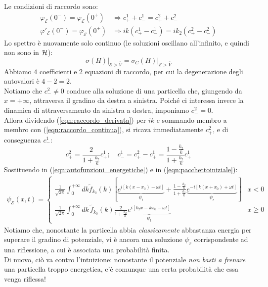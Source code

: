 \documentclass[../../FisicaTeorica.tex]{subfiles}
\begin{document}
Le condizioni di raccordo sono:
\begin{align}
\varphi_\mathcal{E}(0^-)=\varphi_\mathcal{E}(0^+) &\Rightarrow c^1_+ + c^1_- = c^2_+ + c_-^2
\label{eqn:raccordo_continua}
\\
\varphi'_\mathcal{E}(0^-)=\varphi_\mathcal{E}(0^+) &\Rightarrow ik(c_+^1 - c_-^1)=ik_2(c_+^2-c_-^2)
\label{eqn:raccordo_derivata}
\end{align}
Lo spettro è nuovamente solo continuo (le soluzioni oscillano all'infinito, e quindi non sono in $\mathcal{H}$):
\[
\sigma(H)\Big|_{\mathcal{E}>\bar{V}}=\sigma_C(H)\Big|_{\mathcal{E}>\bar{V}}
\]
Abbiamo $4$ coefficienti e $2$ equazioni di raccordo, per cui la degenerazione degli autovalori è $4-2=2$.\\
Notiamo che $c^2_- \neq 0$ conduce alla soluzione di una particella che, giungendo da $x=+\infty$, attraversa il gradino da destra a sinistra. Poiché ci interessa invece la dinamica di attraversamento da sinistra a destra, imponiamo $c^2_-=0$.\\
Allora dividendo (\ref{eqn:raccordo_derivata}) per $ik$ e sommando membro a membro con (\ref{eqn:raccordo_continua}), si ricava immediatamente $c^2_+$, e di conseguenza $c^1_-$:
\begin{equation}
c_+^2 = \frac{2}{1+\frac{k_2}{k}}c_+^1; \quad c_-^1=c^2_+-c^1_+=\frac{1-\frac{k_2}{k}}{1+\frac{k_2}{k}}c_+^1
\label{eqn:costanti_energetiche}
\end{equation}
Sostituendo in (\ref{eqn:autofunzioni_energetiche}) e in (\ref{eqn:pacchettoiniziale}):
\begin{align*}
\psi_\mathcal{E}(x,t) = 
\begin{cases}
\displaystyle
\frac{1}{\sqrt{2\pi}}\int_0^{+\infty} dk \tilde{f}_{k_0}(k) \left[
\underbrace{
e^{i[k(x-x_0)-\omega t]}}_{\psi_i}
+
\frac{1-\frac{k_2}{k}}{1+\frac{k_2}{k}}
\underbrace{e^{-i[k(x+x_0)+\omega t]}}_{\psi_r}
\right]
& x <0 \\
\displaystyle
\frac{1}{\sqrt{2\pi}}\int_0^{+\infty} dk\,\tilde{f}_{k_0}(k) \frac{2}{1+\frac{k_2}{k}}\underbrace{e^{i[k_2 x - kx_0-\omega t]}}_{\psi_t} & x\geq 0
\end{cases}
\end{align*}
Notiamo che, nonostante la particella abbia \textit{classicamente} abbastanza energia per superare il gradino di potenziale, vi è ancora una soluzione $\psi_r$ corrispondente ad una riflessione, a cui è associata una probabilità finita.\\
Di nuovo, ciò va contro l'intuizione: nonostante il potenziale \textit{non basti a frenare} una particella troppo energetica, c'è comunque una certa probabilità che essa venga riflessa!\\
\end{document}
